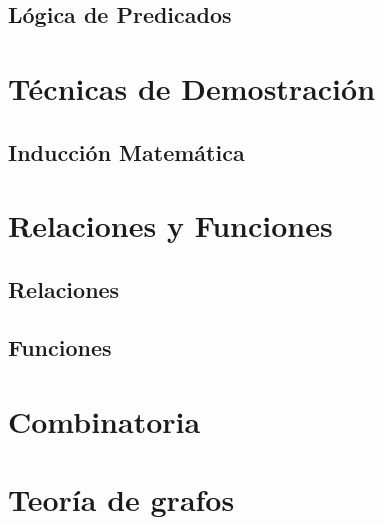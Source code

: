\documentclass[12pt]{book}
\begin{document}
\chapter{Lógica de Predicados}



\newpage
\part{Técnicas de Demostración}
\chapter{Inducción Matemática}



\newpage
\part{Relaciones y Funciones}
\chapter{Relaciones}

\chapter{Funciones}


\newpage
\part{Combinatoria}







\newpage
\part{Teoría de grafos}







\end{document}

